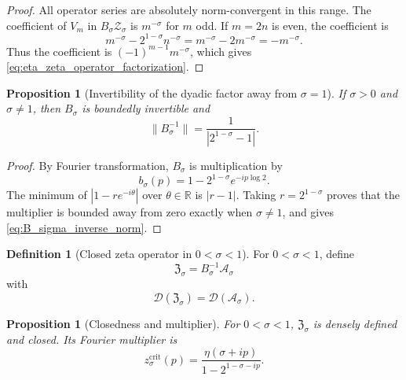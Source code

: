 \documentclass[11pt]{amsart}
\numberwithin{equation}{section}
\theoremstyle{plain}
\newtheorem{proposition}[theorem]{Proposition}
\theoremstyle{definition}
\newtheorem{definition}[theorem]{Definition}
\theoremstyle{remark}
\newcommand{\R}{\mathbb{R}}
\newcommand{\Dom}{\mathcal{D}}
\begin{document}
\begin{proof}
All operator series are absolutely norm-convergent in this range.  The
coefficient of $V_m$ in $B_\sigma\mathcal Z_\sigma$ is $m^{-\sigma}$ for
$m$ odd.  If $m=2n$ is even, the coefficient is
\begin{equation}
m^{-\sigma}
-2^{1-\sigma}n^{-\sigma}
=m^{-\sigma}-2m^{-\sigma}
=-m^{-\sigma}.
\label{eq:dyadic_even_coefficient}
\end{equation}
Thus the coefficient is $(-1)^{m-1}m^{-\sigma}$, which gives
\eqref{eq:eta_zeta_operator_factorization}.
\end{proof}

\begin{proposition}[Invertibility of the dyadic factor away from
$\sigma=1$]
\label{prop:B_sigma_invertibility}
If $\sigma>0$ and $\sigma\neq1$, then $B_\sigma$ is boundedly invertible and
\begin{equation}
\|B_\sigma^{-1}\|
=\frac{1}{|2^{1-\sigma}-1|}.
\label{eq:B_sigma_inverse_norm}
\end{equation}
\end{proposition}

\begin{proof}
By Fourier transformation, $B_\sigma$ is multiplication by
\begin{equation}
b_\sigma(p)
=1-2^{1-\sigma}e^{-ip\log2}.
\label{eq:B_sigma_multiplier}
\end{equation}
The minimum of $|1-re^{-i\theta}|$ over $\theta\in\R$ is $|r-1|$.  Taking
$r=2^{1-\sigma}$ proves that the multiplier is bounded away from zero
exactly when $\sigma\neq1$, and gives
\eqref{eq:B_sigma_inverse_norm}.
\end{proof}

\begin{definition}[Closed zeta operator in $0<\sigma<1$]
\label{def:critical_zeta_operator}
For $0<\sigma<1$, define
\begin{equation}
\mathfrak Z_\sigma
=B_\sigma^{-1}\mathcal A_\sigma
\label{eq:critical_zeta_operator}
\end{equation}
with
\begin{equation}
\Dom(\mathfrak Z_\sigma)
=\Dom(\mathcal A_\sigma).
\label{eq:critical_zeta_domain}
\end{equation}
\end{definition}

\begin{proposition}[Closedness and multiplier]
\label{prop:critical_zeta_properties}
For $0<\sigma<1$, $\mathfrak Z_\sigma$ is densely defined and closed.  Its
Fourier multiplier is
\begin{equation}
z_\sigma^{\mathrm{crit}}(p)
=
\frac{\eta(\sigma+ip)}
{1-2^{1-\sigma-ip}}.
\label{eq:critical_zeta_multiplier}
\end{equation}
\end{proposition}
\end{document}
